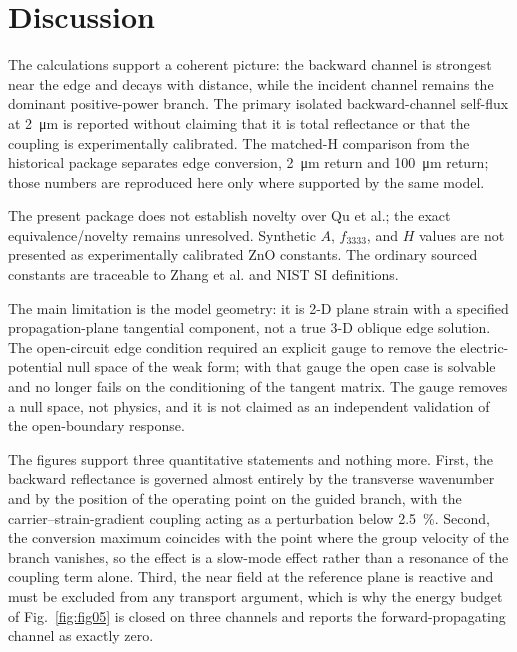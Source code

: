 \section{Discussion}
\label{sec:discussion}
The calculations support a coherent picture: the backward channel is strongest near the edge and decays with distance, while the incident channel remains the dominant positive-power branch. The primary isolated backward-channel self-flux at \SI{2}{\micro\metre} is reported without claiming that it is total reflectance or that the coupling is experimentally calibrated. The matched-H comparison from the historical package separates edge conversion, \SI{2}{\micro\metre} return and \SI{100}{\micro\metre} return; those numbers are reproduced here only where supported by the same model.

The present package does not establish novelty over Qu et al.; the exact equivalence/novelty remains unresolved. Synthetic $A$, $f_{3333}$, and $H$ values are not presented as experimentally calibrated ZnO constants. The ordinary sourced constants are traceable to Zhang et al. and NIST SI definitions.

The main limitation is the model geometry: it is 2-D plane strain with a
specified propagation-plane tangential component, not a true 3-D oblique edge
solution. The open-circuit edge condition required an explicit gauge to remove
the electric-potential null space of the weak form; with that gauge the open
case is solvable and no longer fails on the conditioning of the tangent
matrix. The gauge removes a null space, not physics, and it is not claimed as
an independent validation of the open-boundary response.

The figures support three quantitative statements and nothing more. First, the
backward reflectance is governed almost entirely by the transverse wavenumber
and by the position of the operating point on the guided branch, with the
carrier--strain-gradient coupling acting as a perturbation below
\SI{2.5}{\percent}. Second, the conversion maximum coincides with the point
where the group velocity of the branch vanishes, so the effect is a
slow-mode effect rather than a resonance of the coupling term alone. Third, the
near field at the reference plane is reactive and must be excluded from any
transport argument, which is why the energy budget of Fig.~\ref{fig:fig05} is
closed on three channels and reports the forward-propagating channel as exactly
zero.
